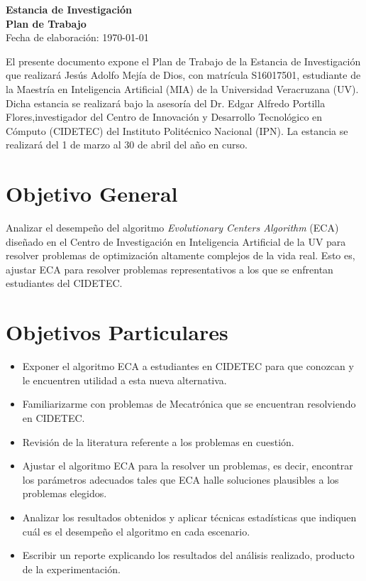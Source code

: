\documentclass[12pt,letterpaper, xcolor=table, x11names]{article}
\newcommand{\mytitle}{ %
% 
	\vspace*{2cm}
	\begin{center}
		{\LARGE \bf Estancia de Investigación}\\[0.1cm]%
		{\Large \bf Plan de Trabajo}\\[0.4cm]%
		{\large Fecha de elaboración: \today}
	\end{center}
	\vspace{0.7cm}
}
\begin{document}
\mytitle

El presente documento expone el Plan de Trabajo de la Estancia de Investigación
que realizará Jesús Adolfo Mejía de Dios, con matrícula S16017501, estudiante de la
Maestría en Inteligencia Artificial (MIA) de la Universidad Veracruzana (UV). Dicha
estancia se realizará bajo la asesoría del Dr. Edgar Alfredo Portilla
Flores,investigador del Centro de Innovación y Desarrollo Tecnológico en Cómputo
(CIDETEC) del Instituto Politécnico Nacional (IPN). La estancia se realizará del 1 de
marzo al 30 de abril del año en curso.

\section{Objetivo General}
Analizar el desempeño del algoritmo \textit{Evolutionary Centers Algorithm} (ECA)
diseñado en el Centro de Investigación en Inteligencia Artificial de la UV para
resolver problemas de optimización altamente complejos de la vida real. Esto es,
ajustar ECA para resolver problemas representativos a los que se enfrentan estudiantes
del CIDETEC.

\section{Objetivos Particulares}
\begin{itemize}
\item Exponer el algoritmo ECA a estudiantes en CIDETEC para que conozcan y le
      encuentren utilidad a esta nueva alternativa.

\item Familiarizarme con problemas de Mecatrónica que se encuentran resolviendo en
      CIDETEC.

\item Revisión de la literatura referente a los problemas en cuestión.

\item Ajustar el algoritmo ECA para la resolver un problemas, es decir, encontrar
      los parámetros adecuados tales que ECA halle soluciones plausibles a los 
      problemas elegidos.

\item Analizar los resultados obtenidos y aplicar técnicas estadísticas que indiquen
      cuál es el desempeño el algoritmo en cada escenario.

\item Escribir un reporte explicando los resultados del análisis realizado, producto de
      la experimentación.
\end{itemize}
\end{document}
